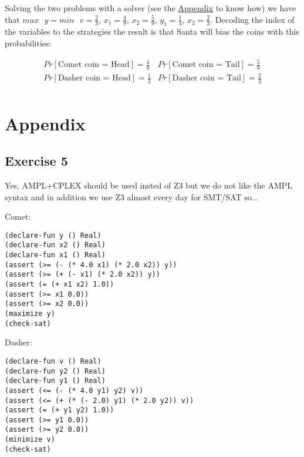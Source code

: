 \documentclass[paper=a4, fontsize=11pt]{scrartcl} %
\numberwithin{equation}{section} %
\numberwithin{figure}{section} %
\numberwithin{table}{section} %
\begin{document}
Solving the two problems with a solver (see the \hyperref[ex5app]{Appendix} to know how) we have that $max\text{ }y = min\text{ }v = \frac{2}{3}$, $x_1 = \frac{4}{9}$, $x_2 = \frac{5}{9}$, $y_1 = \frac{1}{3}$, $x_2 = \frac{2}{3}$.
Decoding the index of the variables to the strategies the result is that Santa will bias the coins with this probabilities:

\[
    \begin{array}{ll}
    Pr[\text{Comet coin = Head}] = \frac{4}{9} & Pr[\text{Comet coin = Tail}] = \frac{5}{9} \\
    Pr[\text{Dasher coin = Head}] = \frac{1}{3} & Pr[\text{Dasher coin = Tail}] = \frac{2}{3} \\
    \end{array}
\]

\newpage
\section*{Appendix}

\subsection*{Exercise 5}
\label{ex5app}

Yes, AMPL+CPLEX should be used insted of Z3 but we do not like the AMPL syntax and in addition we use Z3 almost every day for SMT/SAT so...

\bigskip
Comet:
\begin{verbatim}
(declare-fun y () Real)
(declare-fun x2 () Real)
(declare-fun x1 () Real)
(assert (>= (- (* 4.0 x1) (* 2.0 x2)) y))
(assert (>= (+ (- x1) (* 2.0 x2)) y))
(assert (= (+ x1 x2) 1.0))
(assert (>= x1 0.0))
(assert (>= x2 0.0))
(maximize y)
(check-sat)
\end{verbatim}

Dasher:
\begin{verbatim}
(declare-fun v () Real)
(declare-fun y2 () Real)
(declare-fun y1 () Real)
(assert (<= (- (* 4.0 y1) y2) v))
(assert (<= (+ (* (- 2.0) y1) (* 2.0 y2)) v))
(assert (= (+ y1 y2) 1.0))
(assert (>= y1 0.0))
(assert (>= y2 0.0))
(minimize v)
(check-sat)
\end{verbatim}
\end{document}
